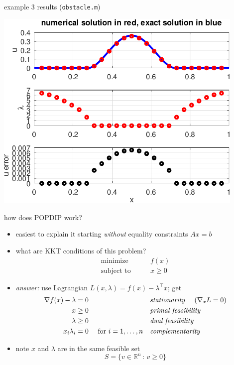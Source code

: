 \documentclass[10pt,hyperref,dvipsnames]{beamer}
\newcommand{\grad}{\nabla}
\newcommand{\RR}{\mathbb{R}}
\begin{document}
\begin{frame}{example 3 results (\texttt{obstacle.m})}

\medskip
\begin{center}
\includegraphics[width=0.9\textwidth]{figs/errorobstacle.pdf}
\end{center}
\end{frame}


\begin{frame}{how does POPDIP work?}

\begin{itemize}
\item easiest to explain it starting \emph{without} equality constraints $Ax=b$
\item what are KKT conditions of this problem?
\begin{equation*}
\begin{matrix}
\text{minimize} \qquad & f(x) \\
\text{subject to} \qquad & x \ge 0
\end{matrix}
\end{equation*}
\item[] \emph{answer:} use Lagrangian $L(x,\lambda) = f(x) - \lambda^\top x$; get
\begin{align*}
\grad f(x) - \lambda &= 0   &&\text{\emph{stationarity} \quad ($\grad_x L=0$)} \\
                   x &\ge 0 &&\text{\emph{primal feasibility}} \\
             \lambda &\ge 0 &&\text{\emph{dual feasibility}} \\
        x_i \lambda_i&= 0 \quad \text{ for } i=1,\dots,n && \text{\emph{complementarity}}
\end{align*}
\item note $x$ and $\lambda$ are in the same feasible set
	$$S = \{v \in \RR^n \,:\, v\ge 0\}$$
\end{itemize}
\end{frame}
\end{document}
